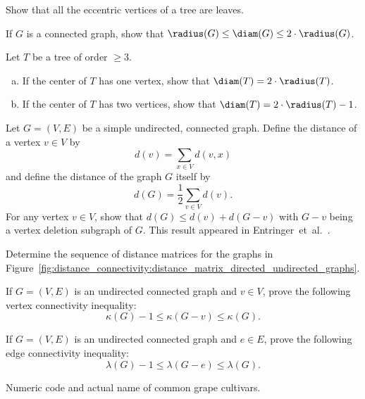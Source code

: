 \begin{problem}
\item\label{prob:distance_connectivity:eccentric_vertices_laves} Show
  that all the eccentric vertices of a tree are leaves.

\item If $G$ is a connected graph, show that
  $\radius(G) \leq \diam(G) \leq 2 \cdot \radius(G)$.

\item Let $T$ be a tree of order $\geq 3$.
  \begin{enumerate}[(a)]
  \item If the center of $T$ has one vertex, show that
    $\diam(T) = 2 \cdot \radius(T)$.

  \item If the center of $T$ has two vertices, show that
    $\diam(T) = 2 \cdot \radius(T) - 1$.
  \end{enumerate}

\item Let $G = (V,E)$ be a simple undirected, connected graph. Define
  the distance of a vertex $v \in V$ by
  \[
  d(v)
  =
  \sum_{x \in V} d(v,x)
  \]
  and define the distance of the graph $G$ itself by
  \[
  d(G)
  =
  \frac{1}{2} \sum_{v \in V} d(v).
  \]
  For any vertex $v \in V$, show that
  $d(G) \leq d(v) + d(G - v)$ with $G - v$ being a vertex deletion
  subgraph of $G$. This result appeared in
  Entringer~et~al.~\cite[p.284]{EntringerEtAl1976}.

\item Determine the sequence of distance matrices for the graphs in
  Figure~\ref{fig:distance_connectivity:distance_matrix_directed_undirected_graphs}.

\item If $G = (V,E)$ is an undirected connected graph and $v \in V$,
  prove the following vertex connectivity inequality:
  \[
  \kappa(G) - 1
  \leq
  \kappa(G - v)
  \leq
  \kappa(G).
  \]

\item If $G = (V,E)$ is an undirected connected graph and $e \in E$,
  prove the following edge connectivity inequality:
  \[
  \lambda(G) - 1
  \leq
  \lambda(G - e)
  \leq
  \lambda(G).
  \]

\begin{table}[!htbp]
\centering
{}

\caption{Numeric code and actual name of common grape cultivars.}
\label{tab:distance_connectivity:wine_network}
\end{table}


\end{problem}
